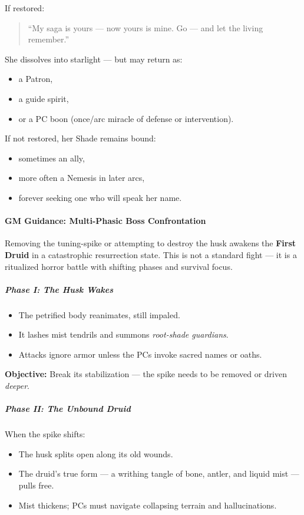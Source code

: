 \documentclass[11pt]{article}
\begin{document}
If restored:
\begin{quote}
``My saga is yours --- now yours is mine.
Go --- and let the living remember.''
\end{quote}

\noindent
She dissolves into starlight --- but may return as:
\begin{itemize}
  \item a Patron,
  \item a guide spirit,
  \item or a PC boon (once/arc miracle of defense or intervention).
\end{itemize}

If not restored, her Shade remains bound:
\begin{itemize}
  \item sometimes an ally,
  \item more often a Nemesis in later arcs,
  \item forever seeking one who will speak her name.
\end{itemize}


\paragraph{GM Guidance: Multi-Phasic Boss Confrontation}

Removing the tuning-spike or attempting to destroy the husk awakens the \textbf{First Druid} in a catastrophic resurrection state.  
This is not a standard fight --- it is a ritualized horror battle with shifting phases and survival focus.

\subparagraph{Phase I: The Husk Wakes}
\begin{itemize}
  \item The petrified body reanimates, still impaled.
  \item It lashes mist tendrils and summons \emph{root-shade guardians}.
  \item Attacks ignore armor unless the PCs invoke sacred names or oaths.
\end{itemize}

\noindent %
\textbf{Objective:} Break its stabilization --- the spike needs to be removed or driven \emph{deeper}.

\subparagraph{Phase II: The Unbound Druid}
When the spike shifts:
\begin{itemize}
  \item The husk splits open along its old wounds.
  \item The druid's true form --- a writhing tangle of bone, antler, and liquid mist --- pulls free.
  \item Mist thickens; PCs must navigate collapsing terrain and hallucinations.
\end{itemize}
\end{document}
